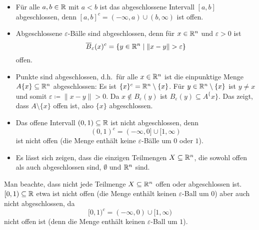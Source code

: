 \documentclass[a4paper,10pt]{article}
\begin{document}
\begin{bsp}
 \begin{itemize}
  \item
   Für alle $a,b \in \mathbb{R}$ mit $a < b$ ist das abgeschlossene Intervall $[a,b]$ abgeschlossen, denn $[a,b]^c = (-\infty,a) \cup (b, \infty)$ ist offen.
  \item
   Abgeschlossene $\varepsilon$-Bälle sind abgeschlossen, denn für $x \in \mathbb{R}^n$ und $\varepsilon > 0$ ist
   \[
    \overline{B}_\varepsilon(x)^c = \{y \in \mathbb{R}^n \mid \|x-y\| > \varepsilon\}
   \]
   offen.
  \item
   Punkte sind abgeschlossen, d.h.\ für alle $x \in \mathbb{R}^n$ ist die einpunktige Menge $A \{x\} \subseteq \mathbb{R}^n$ abgeschlossen: Es ist $\{x\}^c = \mathbb{R}^n \setminus \{x\}$. Für $y \in \mathbb{R}^n \setminus \{x\}$ ist $y \neq x$ und somit $\varepsilon \coloneqq \|x-y\| > 0$. Da $x \notin B_\varepsilon(y)$ ist $B_\varepsilon(y) \subseteq A^\{x\}$. Das zeigt, dass $A \setminus \{x\}$ offen ist, also $\{x\}$ abgeschlossen.
  \item
   Das offene Intervall $(0,1) \subseteq \mathbb{R}$ ist nicht abgeschlossen, denn
   \[
    (0,1)^c = (-\infty,0] \cup [1,\infty)
   \]
   ist nicht offen (die Menge enthält keine $\varepsilon$-Bälle um $0$ oder $1$).
  \item
   Es lässt sich zeigen, dass die einzigen Teilmengen $X \subseteq \mathbb{R}^n$, die sowohl offen als auch abgeschlossen sind, $\emptyset$ und $\mathbb{R}^n$ sind.
 \end{itemize}
\end{bsp}


Man beachte, dass nicht jede Teilmenge $X \subseteq \mathbb{R}^n$ offen oder abgeschlossen ist. $[0,1) \subseteq \mathbb{R}$ etwa ist nicht offen (die Menge enthält keinen $\varepsilon$-Ball um $0$) aber auch nicht abgeschlossen, da
\[
 [0,1)^c = (-\infty,0) \cup [1,\infty)
\]
nicht offen ist (denn die Menge enthält keinen $\varepsilon$-Ball um $1$).
\end{document}
